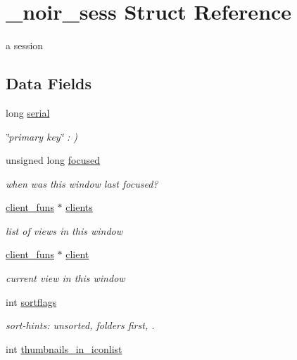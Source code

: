 \hypertarget{struct__noir__sess}{
\section{\_\-noir\_\-sess Struct Reference}
\label{struct__noir__sess}
}
a session  


\subsection*{Data Fields}
\begin{CompactItemize}
\item 
\hypertarget{struct__noir__sess_o0}{
long \hyperlink{struct__noir__sess_o0}{serial}}
\label{struct__noir__sess_o0}

\begin{CompactList}\small\item\em \char`\"{}primary key\char`\"{} : ) \item\end{CompactList}\item 
\hypertarget{struct__noir__sess_o1}{
unsigned long \hyperlink{struct__noir__sess_o1}{focused}}
\label{struct__noir__sess_o1}

\begin{CompactList}\small\item\em when was this window last focused? \item\end{CompactList}\item 
\hypertarget{struct__noir__sess_o2}{
\hyperlink{struct__client__funs}{client\_\-funs} $\ast$ \hyperlink{struct__noir__sess_o2}{clients}}
\label{struct__noir__sess_o2}

\begin{CompactList}\small\item\em list of views in this window \item\end{CompactList}\item 
\hypertarget{struct__noir__sess_o3}{
\hyperlink{struct__client__funs}{client\_\-funs} $\ast$ \hyperlink{struct__noir__sess_o3}{client}}
\label{struct__noir__sess_o3}

\begin{CompactList}\small\item\em current view in this window \item\end{CompactList}\item 
int \hyperlink{struct__noir__sess_o5}{sortflags}
\begin{CompactList}\small\item\em sort-hints: unsorted, folders first, . \item\end{CompactList}\item 
\hypertarget{struct__noir__sess_o6}{
int \hyperlink{struct__noir__sess_o6}{thumbnails\_\-in\_\-iconlist}}
\label{struct__noir__sess_o6}


\end{CompactItemize}
